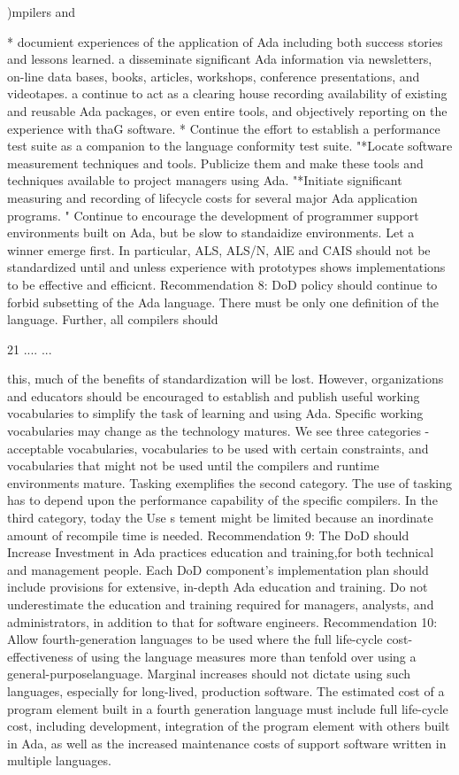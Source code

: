 \documentclass[12pt]{article}
\begin{document}
)mpilers and

* documient experiences of the application of Ada including both success stories and
lessons learned.
a disseminate significant Ada information via newsletters, on-line data bases, books,
articles, workshops, conference presentations, and videotapes.
a continue to act as a clearing house recording availability of existing and reusable
Ada packages, or even entire tools, and objectively reporting on the experience
with thaG software.
* Continue the effort to establish a performance test suite as a companion to the language
conformity test suite.
"*Locate software measurement techniques and tools. Publicize them and make these
tools and techniques available to project managers using Ada.
"*Initiate significant measuring and recording of lifecycle costs for several major Ada
application programs.
" Continue to encourage the development of programmer support environments built on
Ada, but be slow to standaidize environments. Let a winner emerge first. In particular,
ALS, ALS/N, AlE and CAIS should not be standardized until and unless experience
with prototypes shows implementations to be effective and efficicnt.
Recommendation 8: DoD policy should continue to forbid subsetting of the
Ada language.
There must be only one definition of the language. Further, all compilers should

21
....
...

this, much of the benefits of standardization will be lost. However, organizations and
educators should be encouraged to establish and publish useful working vocabularies to
simplify the task of learning and using Ada.
Specific working vocabularies may change as the technology matures. We see three
categories - acceptable vocabularies, vocabularies to be used with certain constraints,
and vocabularies that might not be used until the compilers and runtime environments
mature. Tasking exemplifies the second category. The use of tasking has to depend upon
the performance capability of the specific compilers. In the third category, today the Use
s tement might be limited because an inordinate amount of recompile time is needed.
Recommendation 9: The DoD should Increase Investment in Ada practices
education and training,for both technical and management people.
Each DoD component's implementation plan should include provisions for extensive,
in-depth Ada education and training. Do not underestimate the education and training
required for managers, analysts, and administrators, in addition to that for software
engineers.
Recommendation 10: Allow fourth-generation languages to be used where
the full life-cycle cost-effectiveness of using the language measures more than
tenfold over using a general-purposelanguage.
Marginal increases should not dictate using such languages, especially for long-lived,
production software. The estimated cost of a program element built in a fourth generation
language must include full life-cycle cost, including development, integration of the
program element with others built in Ada, as well as the increased maintenance costs
of support software written in multiple languages.
\end{document}
